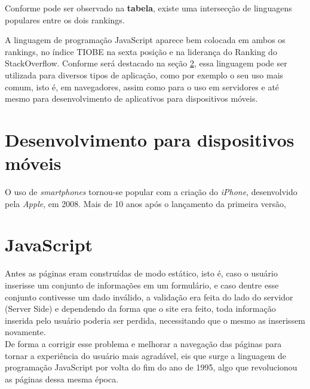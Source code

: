 Conforme pode ser observado na \textbf{tabela}, existe uma intersecção de linguagens populares entre os dois rankings.

A linguagem de programação JavaScript aparece bem colocada em ambos os rankings, no índice TIOBE na sexta posição e na liderança do Ranking do StackOverflow. Conforme será destacado na seção \ref{JavaScript}, essa linguagem pode ser utilizada para diversos tipos de aplicação, como por exemplo o seu uso mais comum, isto é, em navegadores, assim como para o uso em servidores e até mesmo para desenvolvimento de aplicativos para dispositivos móveis.

\section{Desenvolvimento para dispositivos móveis}

O uso de \textit{smartphones} tornou-se popular com a criação do \textit{iPhone}, desenvolvido pela \textit{Apple}, em 2008. Mais de 10 anos após o lançamento da primeira versão, 


\section{JavaScript}\label{JavaScript}

Antes as páginas eram construídas de modo estático, isto é, caso o usuário inserisse um conjunto de informações em um formulário, e caso dentre esse conjunto contivesse um dado inválido, a validação era feita do lado do servidor (Server Side) e dependendo da forma que o site era feito, toda informação inserida pelo usuário poderia ser perdida, necessitando que o mesmo as inserissem novamente.\\

De forma a corrigir esse problema e melhorar a navegação das páginas para tornar a experiência do usuário mais agradável, eis que surge a linguagem de programação JavaScript por volta do fim do ano de 1995, algo que revolucionou as páginas dessa mesma época.\\

